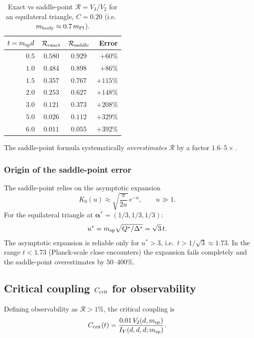 \begin{table}[h]
\centering
\caption{Exact vs saddle-point $\mathcal{R}=V_3/V_2$ for an equilateral
triangle, $C=0.20$ (i.e.\ $m_{\rm body}\approx 0.7\,m_{\rm Pl}$).}
\label{tab:v3v2_exact}
\begin{tabular}{rccr}
\hline
$t=m_{\rm sp}d$ & $\mathcal{R}_{\rm exact}$ & $\mathcal{R}_{\rm saddle}$ & Error \\
\hline
$0.5$ & $0.580$  & $0.929$  & $+60\%$  \\
$1.0$ & $0.484$  & $0.898$  & $+86\%$  \\
$1.5$ & $0.357$  & $0.767$  & $+115\%$ \\
$2.0$ & $0.253$  & $0.627$  & $+148\%$ \\
$3.0$ & $0.121$  & $0.373$  & $+208\%$ \\
$5.0$ & $0.026$  & $0.112$  & $+329\%$ \\
$6.0$ & $0.011$  & $0.055$  & $+392\%$ \\
\hline
\end{tabular}
\end{table}

\noindent
The saddle-point formula systematically \emph{overestimates} $\mathcal{R}$ by
a factor $1.6$--$5\times$.

\subsubsection{Origin of the saddle-point error}

The saddle-point relies on the asymptotic expansion
\begin{equation}
  K_0(u)\approx\sqrt{\frac{\pi}{2u}}\,e^{-u},\qquad u\gg 1.
\end{equation}
For the equilateral triangle at $\boldsymbol{\alpha}^* = (1/3,1/3,1/3)$:
\begin{equation}
  u^* = m_{\rm sp}\sqrt{Q^*/\Delta^*}= \sqrt{3}\,t.
\end{equation}
The asymptotic expansion is reliable only for $u^*>3$, i.e.\ $t>1/\sqrt{3}\approx1.73$.
In the range $t<1.73$ (Planck-scale close encounters) the expansion fails completely
and the saddle-point overestimates by $50$--$400\%$.

\subsection{Critical coupling $C_{\rm crit}$ for observability}

Defining observability as $\mathcal{R}>1\%$, the critical coupling is
\begin{equation}
  C_{\rm crit}(t) = \frac{0.01\,V_2(d,m_{\rm sp})}{I_Y(d,d,d;m_{\rm sp})}.
\end{equation}

